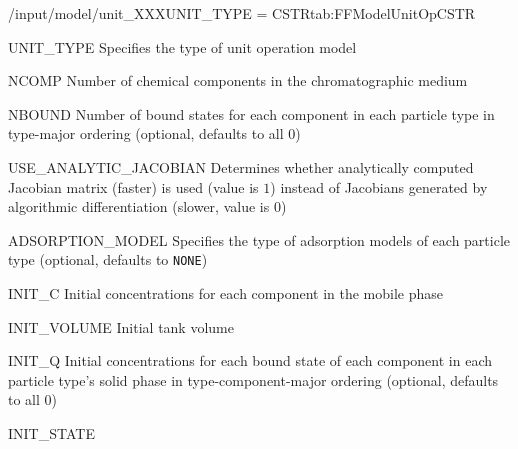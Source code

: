 \begin{condsubgroup}{/input/model/unit\_XXX}{UNIT\_TYPE = CSTR}{tab:FFModelUnitOpCSTR}
  \begin{dataset}[type=string,range={\texttt{CSTR}},length=1]{UNIT\_TYPE}
    Specifies the type of unit operation model
  \end{dataset}
  \begin{dataset}[type=int,range={$\geq 1$},length=1]{NCOMP}
    Number of chemical components in the chromatographic medium
  \end{dataset}
  \begin{dataset}[type=int,range={$\geq 0$},length={$\texttt{NPARTYPE} \cdot \texttt{NCOMP}$}]{NBOUND}
    Number of bound states for each component in each particle type in type-major ordering (optional, defaults to all $0$)
  \end{dataset}
  \begin{dataset}[type=int,range={$\{0, 1\}$},length=1]{USE\_ANALYTIC\_JACOBIAN}
    Determines whether analytically computed Jacobian matrix (faster) is used (value is $1$) instead of Jacobians generated by algorithmic differentiation (slower, value is $0$)
  \end{dataset}
  \begin{dataset}[type=string,range={See Section~\ref{sec:FFAdsorption}},length={\texttt{NPARTYPE}}]{ADSORPTION\_MODEL}
    Specifies the type of adsorption models of each particle type (optional, defaults to \texttt{NONE})
  \end{dataset}
  \begin{dataset}[unit=\si{\mol\per\cubic\metre\of{IV}},type=double,range={$\geq 0$},length={\texttt{NCOMP}}]{INIT\_C}
    Initial concentrations for each component in the mobile phase
  \end{dataset}
  \begin{dataset}[unit=\si{\cubic\metre},type=double,range={$\geq 0$},length=1]{INIT\_VOLUME}
    Initial tank volume
  \end{dataset}
  \begin{dataset}[unit=\si{\mol\per\cubic\metre\of{SP}},type=double,range={$\geq 0$},length={\texttt{NTOTALBND}}]{INIT\_Q}
    Initial concentrations for each bound state of each component in each particle type's solid phase in type-component-major ordering (optional, defaults to all $0$)
  \end{dataset}
  \begin{dataset}[unit=various,type=double,range={$\mathds{R}$},length={\texttt{NDOF} / $2\texttt{NDOF}$}]{INIT\_STATE}

\end{dataset}
\end{condsubgroup}
